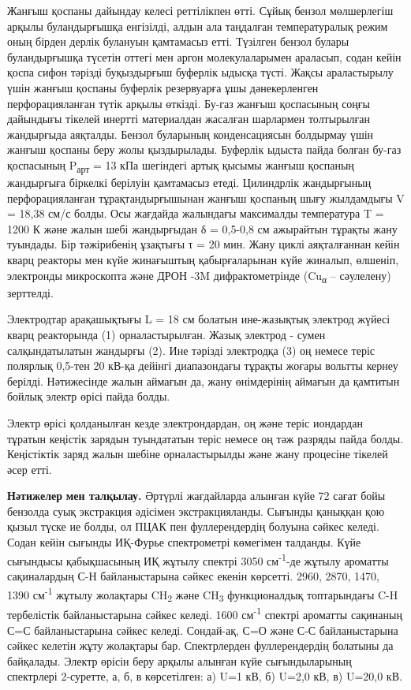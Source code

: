 Жанғыш қоспаны дайындау келесі реттілікпен өтті. Сұйық бензол
мөлшерлегіш арқылы буландырғышқа енгізілді, алдын ала таңдалған
температуралық режим оның бірден дерлік булануын қамтамасыз етті.
Түзілген бензол булары буландырғышқа түсетін оттегі мен аргон
молекулаларымен араласып, содан кейін қоспа сифон тәрізді буқыздырғыш
буферлік ыдысқа түсті. Жақсы араластырылу үшін жанғыш қоспаны буферлік
резервуарға ұшы дәнекерленген перфорацияланған түтік арқылы өткізді.
Бу-газ жанғыш қоспасының соңғы дайындығы тікелей инертті материалдан
жасалған шарлармен толтырылған жандырғыда аяқталды. Бензол буларының
конденсациясын болдырмау үшін жанғыш қоспаны беру жолы қыздырылады.
Буферлік ыдыста пайда болған бу-газ қоспасының P\textsubscript{арт} = 13
кПа шегіндегі артық қысымы жанғыш қоспаның жандырғыға біркелкі берілуін
қамтамасыз етеді. Цилиндрлік жандырғының перфорацияланған
тұрақтандырғышынан жанғыш қоспаның шығу жылдамдығы V = 18,38 см/с болды.
Осы жағдайда жалындағы максималды температура T = 1200 К және жалын шебі
жандырғыдан δ = 0,5-0,8 см ажырайтын тұрақты жану туындады. Бір
тәжірибенің ұзақтығы τ = 20 мин. Жану циклі аяқталғаннан кейін кварц
реакторы мен күйе жинағыштың қабырғаларынан күйе жиналып, өлшеніп,
электронды микроскопта және ДРОН -3M дифрактометрінде
(Cu\textsubscript{α} -- сәулелену) зерттелді.

Электродтар арақашықтығы L = 18 см болатын ине-жазықтық электрод жүйесі
кварц реакторында (1) орналастырылған. Жазық электрод - сумен
салқындатылатын жандырғы (2). Ине тәрізді электродқа (3) оң немесе теріс
полярлық 0,5-тен 20 кВ-қа дейінгі диапазондағы тұрақты жоғары вольтты
кернеу берілді. Нәтижесінде жалын аймағын да, жану өнімдерінің аймағын
да қамтитын бойлық электр өрісі пайда болды.

Электр өрісі қолданылған кезде электрондардан, оң және теріс иондардан
тұратын кеңістік зарядын туындататын теріс немесе оң тәж разряды пайда
болды. Кеңістіктік заряд жалын шебіне орналастырылды және жану процесіне
тікелей әсер етті.

{\bfseries Нәтижелер} {\bfseries мен талқылау.} Әртүрлі жағдайларда алынған
күйе 72 сағат бойы бензолда суық экстракция әдісімен экстракцияланды.
Сығынды қаныққан қою қызыл түске ие болды, ол ПЦАК пен фуллерендердің
болуына сәйкес келеді. Содан кейін сығынды ИҚ-Фурье спектрометрі
көмегімен талданды. Күйе сығындысы қабықшасының ИҚ жұтылу спектрі 3050
см\textsuperscript{-1}-де жұтылу ароматты сақиналардың С-Н
байланыстарына сәйкес екенін көрсетті. 2960, 2870, 1470, 1390
см\textsuperscript{-1} жұтылу жолақтары CH\textsubscript{2} және
CH\textsubscript{3} функционалдық топтарындағы C-H тербелістік
байланыстарына сәйкес келеді. 1600 см\textsuperscript{-1} спектрі
ароматты сақинаның С=С байланыстарына сәйкес келеді. Сондай-ақ, С=О және
С-С байланыстарына сәйкес келетін жұту жолақтары бар. Спектрлерден
фуллерендердің болатыны да байқалады. Электр өрісін беру арқылы алынған
күйе сығындыларының спектрлері 2-суретте, а, б, в көрсетілген: а) U=1
кВ, б) U=2,0 кВ, в) U=20,0 кВ.

